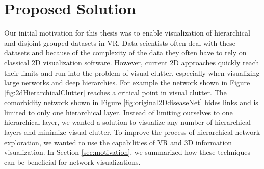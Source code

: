\chapter{Proposed Solution}
\label{chap:proposed-Solution}

Our initial motivation for this thesis was to enable visualization of hierarchical and disjoint grouped datasets in VR. 
Data scientists often deal with these datasets and because of the complexity of the data they often have to rely on classical 2D visualization software.
However, current 2D approaches quickly reach their limits and run into the problem of visual clutter, especially when visualizing large networks and deep hierarchies. For example the network shown in Figure \ref{fig:2dHierarchicalClutter} reaches a critical point in visual clutter. The comorbidity network shown in Figure \ref{fig:original2DdiseaseNet} hides links and is limited to only one hierarchical layer.
Instead of limiting ourselves to one hierarchical layer, we wanted a solution to visualize any number of hierarchical layers and minimize visual clutter.
To improve the process of hierarchical network exploration, we wanted to use the capabilities of VR and 3D information visualization. In Section \ref{sec:motivation}, we summarized how these techniques can be beneficial for network visualizations.  


